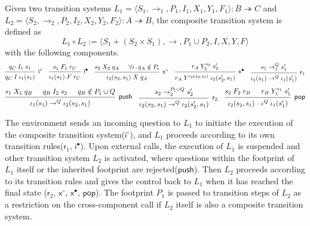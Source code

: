 \documentclass[sigplan,10pt,review,anonymous]{acmart}
\newcommand{\kw}[1]{\ensuremath{ \mathsf{#1} }}
\begin{document}
\begin{definition} \label{def:lts-comp}
Given two transition systems
$L_1 = \langle S_1, {\rightarrow_1}, P_1, I_1, X_1, Y_1, F_1 \rangle
: B \twoheadrightarrow C$ and
$L_2 = \langle S_2, {\rightarrow_2}, P_2, I_2, X_2, Y_2, F_2 \rangle
: A \twoheadrightarrow B$,
the composite transition system is defined as
\[
  L_1 \circ L_2 :=
  \langle S_1 + (S_2 \times S_1), {\rightarrow}, P_1 \cup P_2, I, X, Y, F \rangle
\]
with the following components.
\[
  \begin{prooftree}
    \hypo{q_C \mathrel{I_1} s_1}
    \infer1[$\kw{i}^\circ$]{q_C \mathrel{I} \iota_1(s_1)}
  \end{prooftree}
  \quad
  \begin{prooftree}
    \hypo{s_1 \mathrel{F_1} r_C}
    \infer1[$\kw{i}^\bullet$]{\iota_1(s_1) \mathrel{F} r_C}
  \end{prooftree}
  \quad
  \begin{prooftree}
    \hypo{s_2 \mathrel{X_2} q_A}
    \hypo{\forall i\,.\, q_A \notin P_i}
    \infer2[$\kw{x}^\circ$]{\iota_2(s_2, s_1) \mathrel{X} q_A}
  \end{prooftree}
  \quad
  \begin{prooftree}
    \hypo{r_A \mathrel{Y_2^{s_2}} s_2'}
    \infer1[$\kw{x}^\bullet$]{r_A \mathrel{Y^{\iota_2(s_2, s_1)}} \iota_2(s_2', s_1)}
  \end{prooftree}
  \quad
  \begin{prooftree}
    \hypo{s_1 \rightarrow_1^Q s_1'}
    \infer1[$\kw{r}_1$]{\iota_1(s_1) \rightarrow^Q \iota_1(s_1')}
  \end{prooftree}
\]
\[
  \begin{prooftree}
    \hypo{s_1 \mathrel{X_1} q_B}
    \hypo{q_B \mathrel{I_2} s_2}
    \hypo{q_B \notin P_1 \cup Q}
    \infer3[\kw{push}]{\iota_1(s_1) \rightarrow^Q \iota_2(s_2, s_1)}
  \end{prooftree}
  \quad
  \begin{prooftree}
    \hypo{s_2 \rightarrow_2^{P_1 \cup Q} s_2'}
    \infer1[$\kw{r}_2$]{\iota_2(s_2, s_1) \rightarrow^Q \iota_2(s_2', s_1)}
  \end{prooftree}
  \quad
  \begin{prooftree}
    \hypo{s_2 \mathrel{F_2} r_B}
    \hypo{r_B \mathrel{Y_1^{s_1}} s_1'}
    \infer2[\kw{pop}]{\iota_2(s_2, s_1) \rightarrow^Q \iota_1(s_1')}
  \end{prooftree}
\]
\end{definition}
The environment sends an incoming question to $L_1$ to initiate the execution of
the composite transition system($\kw{i}^\circ$), and $L_1$ proceeds according to
its own transition rules($\kw{r}_1$, $\kw{i}^\bullet$). Upon external calls, the
execution of $L_1$ is suspended and other transition system $L_2$ is activated,
where questions within the footprint of $L_1$ itself or the inherited footprint
are rejected($\kw{push}$). Then $L_2$ proceeds according to its transition rules
and gives the control back to $L_1$ when it has reached the final state
($\kw{r}_2$, $\kw{x}^\circ$, $\kw{x}^\bullet$, $\kw{pop}$). The footprint $P_1$
is passed to transition steps of $L_2$ as a restriction on the cross-component
call if $L_2$ itself is also a composite transition system.
\end{document}

